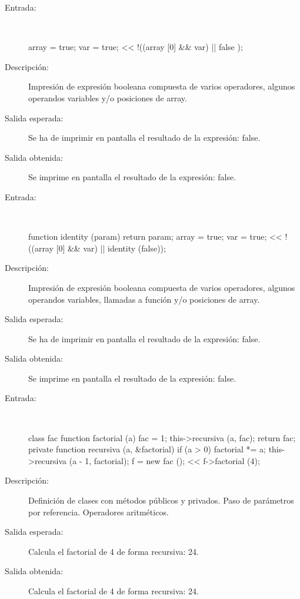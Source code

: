 	\begin{description}
		\item [Entrada:] \hfill \\
\begin{myverbatim}
   array = {true};
   var = true;
   << !((array [0] && var) || false );
\end{myverbatim}
		\item [Descripción:] Impresión de expresión booleana compuesta de varios operadores, algunos operandos variables y/o posiciones de array.
		\item [Salida esperada:] Se ha de imprimir en pantalla el resultado de la expresión: false.
		\item [Salida obtenida:] Se imprime en pantalla el resultado de la expresión: false.
	\end{description}

	\begin{description}
		\item [Entrada:] \hfill \\
\begin{myverbatim}
   function identity (param) {
      return param;
   }
   array = {true};
   var = true;
   << !((array [0] && var) || identity (false));
\end{myverbatim}
		\item [Descripción:] Impresión de expresión booleana compuesta de varios operadores, algunos operandos variables, llamadas a función y/o posiciones de array.
		\item [Salida esperada:] Se ha de imprimir en pantalla el resultado de la expresión: false.
		\item [Salida obtenida:] Se imprime en pantalla el resultado de la expresión: false.
	\end{description}

	\begin{description}
		\item [Entrada:] \hfill \\
\begin{myverbatim}
 class fac {
  function factorial (a) {
    fac = 1;
    this->recursiva (a, fac);
    return fac;
  }
  private function recursiva (a, &factorial){
    if (a > 0){
      factorial *=  a;
      this->recursiva (a - 1, factorial);
    } 
  }
 }
 f = new fac ();
 << f->factorial (4); 
\end{myverbatim}
		\item [Descripción:] Definición de clases con métodos públicos y privados. Paso de parámetros por referencia. Operadores aritméticos.
		\item [Salida esperada:] Calcula el factorial de 4 de forma recursiva: 24.
		\item [Salida obtenida:] Calcula el factorial de 4 de forma recursiva: 24.
	\end{description}

